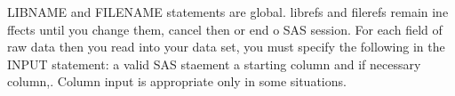 LIBNAME and FILENAME statements are global. librefs and filerefs remain ine ffects
until you change them, cancel then or end o SAS session.
For each field of raw data then you read into your data set, you must specify
the following in the INPUT statement: a valid SAS staement
a starting column and if necessary column,.
Column input is appropriate only in some
situations.
